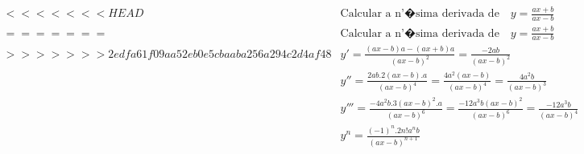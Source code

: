 \begin{ex}
\begin{align}
<<<<<<< HEAD
&\text{Calcular a n'�sima derivada de} \quad y=\frac{ax+b}{ax-b}\nonumber\\
=======
&\text{Calcular a n'�sima derivada de} \quad y=\frac{ax+b}{ax-b}\nonumber\\
>>>>>>> 2edfa61f09aa52eb0e5cbaaba256a294c2d4af48
&y'=\frac{(ax-b)a-(ax+b)a}{(ax-b)^2}=\frac{-2ab}{(ax-b)^2}\nonumber\\
&y''=\frac{2ab.2(ax-b).a}{(ax-b)^4}=\frac{4a^2(ax-b)}{(ax-b)^4}=\frac{4a^2b}{(ax-b)^3}\nonumber\\
&y'''=\frac{-4a^2b.3(ax-b)^2.a}{(ax-b)^6}=\frac{-12a^3b(ax-b)^2}{(ax-b)^6}=\frac{-12a^3b}{(ax-b)^4}\nonumber\\
&y^{n}=\frac{(-1)^n.2n!a^{n}b}{(ax-b)^{n+1}}\nonumber
\end{align}
\end{ex}



